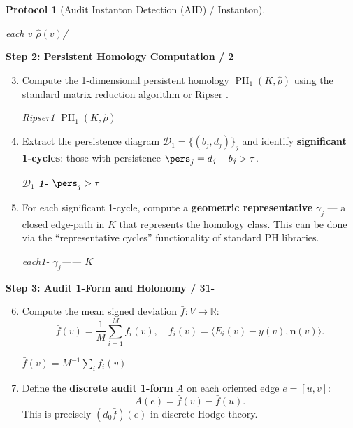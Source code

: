 \documentclass[11pt,a4paper]{article}
\theoremstyle{plain}
\theoremstyle{definition}
\newtheorem{protocol}[theorem]{Protocol}
\DeclareMathOperator{\PH}{PH}
\newcommand{\R}{\mathbb{R}}
\newcommand{\cD}{\mathcal{D}}
\begin{document}
\begin{protocol}[Audit Instanton Detection (AID) / Instanton]
\begin{enumerate}[label=\arabic*.]
        \textit{each $v$  $\hat{\rho}(v)$/}
\end{enumerate}

\textbf{Step 2: Persistent Homology Computation / 2}
\begin{enumerate}[label=\arabic*.]
  \setcounter{enumi}{2}
  \item Compute the 1-dimensional persistent homology 
        $\PH_1(K, \hat{\rho})$ using the standard matrix reduction 
        algorithm \cite{edelsbrunner2008} or Ripser \cite{bauer2021}.
  
        \textit{Ripser1 $\PH_1(K, \hat{\rho})$}

  \item Extract the persistence diagram $\cD_1 = \{(b_j, d_j)\}_{j}$ and 
        identify \textbf{significant 1-cycles}: those with persistence 
        $\pers_j = d_j - b_j > \tau$.
        
        \textit{ $\cD_1$ \textbf{1-} $\pers_j > \tau$ }

  \item For each significant 1-cycle, compute a \textbf{geometric 
        representative} $\gamma_j$ — a closed edge-path in $K$ that 
        represents the homology class. This can be done via the 
        ``representative cycles'' functionality of standard PH libraries.
        
        \textit{each1-\textbf{} $\gamma_j$—— $K$ }
\end{enumerate}

\textbf{Step 3: Audit 1-Form and Holonomy / 31-}
\begin{enumerate}[label=\arabic*.]
  \setcounter{enumi}{5}
  \item Compute the mean signed deviation $\bar{f}: V \to \R$:
        \begin{equation}
          \bar{f}(v) = \frac{1}{M} \sum_{i=1}^{M} f_i(v),
          \quad f_i(v) = \langle E_i(v) - y(v), \mathbf{n}(v) \rangle.
          \label{eq:f_bar_disc}
        \end{equation}
        
        \textit{ $\bar{f}(v) = M^{-1} \sum_i f_i(v)$}
  
  \item Define the \textbf{discrete audit 1-form} $A$ on each oriented 
        edge $e = [u, v]$:
        \begin{equation}
          A(e) = \bar{f}(v) - \bar{f}(u).
          \label{eq:A_disc}
        \end{equation}
        This is precisely $(d_0 \bar{f})(e)$ in discrete Hodge theory.
        

\end{enumerate}
\end{protocol}
\end{document}
